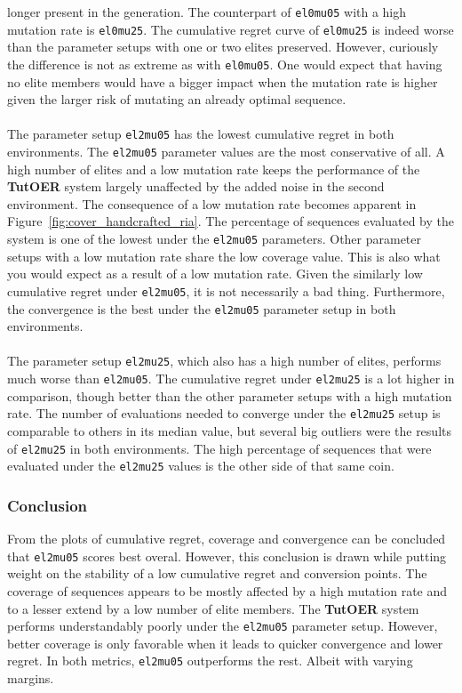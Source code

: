 longer present in the generation. The counterpart of \texttt{el0mu05} with a high
mutation rate is \texttt{el0mu25}. The cumulative regret curve of \texttt{el0mu25}
is indeed worse than the parameter setups with one or two elites preserved.
However, curiously the difference is not as extreme as with \texttt{el0mu05}.
One would expect that having no elite members would have a bigger impact when
the mutation rate is higher given the larger risk of mutating an already
optimal sequence.\\\\
\noindent
The parameter setup \texttt{el2mu05} has the lowest cumulative regret in both
environments. The \texttt{el2mu05} parameter values are the most conservative of
all. A high number of elites and a low mutation rate keeps the performance of
the \textbf{TutOER} system largely unaffected by the added noise in the second
environment. The consequence of a low mutation rate becomes apparent in
Figure~\ref{fig:cover_handcrafted_ria}. The percentage of sequences evaluated by
the system is one of the lowest under the \texttt{el2mu05} parameters.
Other parameter setups with a low mutation rate share the low coverage value.
This is also what you would expect as a result of a low mutation rate. Given
the similarly low cumulative regret under \texttt{el2mu05}, it is not necessarily a
bad thing. Furthermore, the convergence is the best under the \texttt{el2mu05}
parameter setup in both environments.\\\\
\noindent
The parameter setup \texttt{el2mu25}, which also has a high number of elites,
performs much worse than \texttt{el2mu05}. The cumulative regret under
\texttt{el2mu25} is a lot higher in comparison, though better than the other
parameter setups with a high mutation rate. The number of evaluations needed to
converge under the \texttt{el2mu25} setup is comparable to others in its median
value, but several big outliers were the results of \texttt{el2mu25} in both
environments. The high percentage of sequences that were evaluated under the
\texttt{el2mu25} values is the other side of that same coin.
\subsubsection*{Conclusion}
From the plots of cumulative regret, coverage and convergence can
be concluded that \texttt{el2mu05} scores best overal. However, this conclusion is
drawn while putting weight on the stability of a low cumulative regret and
conversion points. The coverage of sequences appears to be mostly affected by
a high mutation rate and to a lesser extend by a low number of elite members.
The \textbf{TutOER} system performs understandably poorly under the \texttt{el2mu05}
parameter setup. However, better coverage is only favorable when it leads to quicker
convergence and lower regret. In both metrics, \texttt{el2mu05} outperforms the
rest. Albeit with varying margins.

